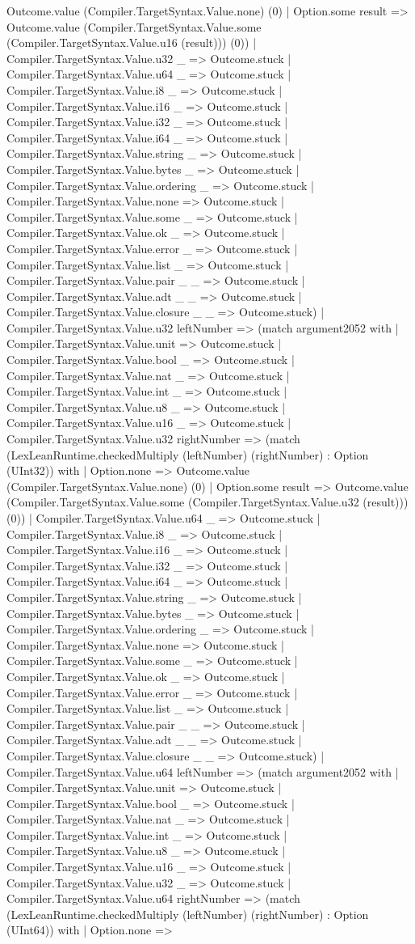 \documentclass[11pt]{article}
\begin{document}
Outcome.value (Compiler.TargetSyntax.Value.none) (0) | Option.some result => Outcome.value (Compiler.TargetSyntax.Value.some (Compiler.TargetSyntax.Value.u16 (result))) (0)) | Compiler.TargetSyntax.Value.u32 \_ => Outcome.stuck | Compiler.TargetSyntax.Value.u64 \_ => Outcome.stuck | Compiler.TargetSyntax.Value.i8 \_ => Outcome.stuck | Compiler.TargetSyntax.Value.i16 \_ => Outcome.stuck | Compiler.TargetSyntax.Value.i32 \_ => Outcome.stuck | Compiler.TargetSyntax.Value.i64 \_ => Outcome.stuck | Compiler.TargetSyntax.Value.string \_ => Outcome.stuck | Compiler.TargetSyntax.Value.bytes \_ => Outcome.stuck | Compiler.TargetSyntax.Value.ordering \_ => Outcome.stuck | Compiler.TargetSyntax.Value.none => Outcome.stuck | Compiler.TargetSyntax.Value.some \_ => Outcome.stuck | Compiler.TargetSyntax.Value.ok \_ => Outcome.stuck | Compiler.TargetSyntax.Value.error \_ => Outcome.stuck | Compiler.TargetSyntax.Value.list \_ => Outcome.stuck | Compiler.TargetSyntax.Value.pair \_ \_ => Outcome.stuck | Compiler.TargetSyntax.Value.adt \_ \_ => Outcome.stuck | Compiler.TargetSyntax.Value.closure \_ \_ => Outcome.stuck) | Compiler.TargetSyntax.Value.u32 leftNumber => (match argument2052 with | Compiler.TargetSyntax.Value.unit => Outcome.stuck | Compiler.TargetSyntax.Value.bool \_ => Outcome.stuck | Compiler.TargetSyntax.Value.nat \_ => Outcome.stuck | Compiler.TargetSyntax.Value.int \_ => Outcome.stuck | Compiler.TargetSyntax.Value.u8 \_ => Outcome.stuck | Compiler.TargetSyntax.Value.u16 \_ => Outcome.stuck | Compiler.TargetSyntax.Value.u32 rightNumber => (match (LexLeanRuntime.checkedMultiply (leftNumber) (rightNumber) : Option (UInt32)) with | Option.none => Outcome.value (Compiler.TargetSyntax.Value.none) (0) | Option.some result => Outcome.value (Compiler.TargetSyntax.Value.some (Compiler.TargetSyntax.Value.u32 (result))) (0)) | Compiler.TargetSyntax.Value.u64 \_ => Outcome.stuck | Compiler.TargetSyntax.Value.i8 \_ => Outcome.stuck | Compiler.TargetSyntax.Value.i16 \_ => Outcome.stuck | Compiler.TargetSyntax.Value.i32 \_ => Outcome.stuck | Compiler.TargetSyntax.Value.i64 \_ => Outcome.stuck | Compiler.TargetSyntax.Value.string \_ => Outcome.stuck | Compiler.TargetSyntax.Value.bytes \_ => Outcome.stuck | Compiler.TargetSyntax.Value.ordering \_ => Outcome.stuck | Compiler.TargetSyntax.Value.none => Outcome.stuck | Compiler.TargetSyntax.Value.some \_ => Outcome.stuck | Compiler.TargetSyntax.Value.ok \_ => Outcome.stuck | Compiler.TargetSyntax.Value.error \_ => Outcome.stuck | Compiler.TargetSyntax.Value.list \_ => Outcome.stuck | Compiler.TargetSyntax.Value.pair \_ \_ => Outcome.stuck | Compiler.TargetSyntax.Value.adt \_ \_ => Outcome.stuck | Compiler.TargetSyntax.Value.closure \_ \_ => Outcome.stuck) | Compiler.TargetSyntax.Value.u64 leftNumber => (match argument2052 with | Compiler.TargetSyntax.Value.unit => Outcome.stuck | Compiler.TargetSyntax.Value.bool \_ => Outcome.stuck | Compiler.TargetSyntax.Value.nat \_ => Outcome.stuck | Compiler.TargetSyntax.Value.int \_ => Outcome.stuck | Compiler.TargetSyntax.Value.u8 \_ => Outcome.stuck | Compiler.TargetSyntax.Value.u16 \_ => Outcome.stuck | Compiler.TargetSyntax.Value.u32 \_ => Outcome.stuck | Compiler.TargetSyntax.Value.u64 rightNumber => (match (LexLeanRuntime.checkedMultiply (leftNumber) (rightNumber) : Option (UInt64)) with | Option.none => 
\end{document}
